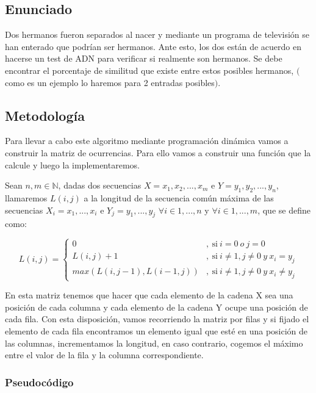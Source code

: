 \subsection{Enunciado}
Dos hermanos fueron separados al nacer y mediante un programa de televisión se han
enterado que podrían ser hermanos. Ante esto, los dos están de acuerdo en hacerse un test de
ADN para verificar si realmente son hermanos. Se debe encontrar el porcentaje de similitud que existe 
entre estos posibles hermanos, $($como es un ejemplo lo haremos para 2 entradas posibles$)$.

\subsection{Metodología} \label{sec:metodologia}
Para llevar a cabo este algoritmo mediante programación dinámica vamos a construir la matriz de 
ocurrencias. Para ello vamos a construir una función que la calcule y luego la implementaremos.

Sean $n,m \in \mathbb{N}$, dadas dos secuencias $X = { x_1,x_2,...,x_m}$ e $Y = { y_1,y_2,...,y_n}$, llamaremos $L(i,j)$ a la 
longitud de la secuencia común máxima de las secuencias $X_i = {x_1,...,x_i}$ e $Y_j = {y_1,...,y_j}$ $\forall i \in {1,...,n} $ y $\forall i \in {1,...,m}$, 
que se define como:  

\[
  L(i,j) = 
  \left \{
    \begin{aligned}
      0 &,\ \text{si} \ i = 0 \ o \ j = 0\\
      L(i,j) + 1 &,\ \text{si} \ i \neq  1 , j \neq  0 \ y \ x_i = y_j\\
      max(L(i,j-1) , L(i-1,j))&,\ \text{si} \ i \neq 1 , j \neq 0 \ y \ x_i \neq y_j
    \end{aligned}
  \right .
\]

En esta matriz tenemos que hacer que cada elemento de la cadena X sea una posición de cada columna 
y cada elemento de la cadena Y ocupe una posición de cada fila. Con esta disposición, vamos recorriendo
la matriz por filas y si fijado el elemento de cada fila encontramos un elemento igual que esté en una 
posición de las columnas, incrementamos la longitud, en caso contrario, cogemos el máximo entre el valor de 
la fila y la columna correspondiente.

\subsubsection{Pseudocódigo}

